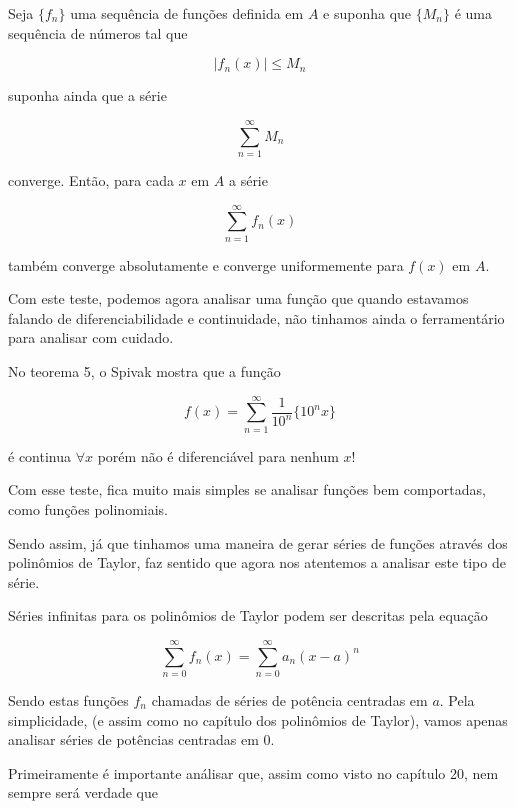 \documentclass[a4paper, 12pt]{article}
\begin{document}
Seja $\{f_n\}$ uma sequência de funções definida em $A$ e suponha que $\{M_n\}$ é uma sequência de números
tal que 

\begin{equation}
	\nonumber |f_n(x) | \leq M_n
\end{equation}

suponha ainda que a série

\begin{equation}
	\nonumber \sum_{n=1}^\infty M_n
\end{equation}

converge. Então, para cada $x$ em $A$ a série

\begin{equation}
	\nonumber \sum_{n=1}^\infty f_n(x)
\end{equation}

também converge absolutamente e converge uniformemente para $f(x)$ em $A$.

Com este teste, podemos agora analisar uma função que quando estavamos falando de diferenciabilidade 
e continuidade, não tinhamos ainda o ferramentário para analisar com cuidado.

No teorema 5, o Spivak mostra que a função

\begin{equation}
	\nonumber f(x) = \sum_{n=1}^\infty \frac{1}{10^n}\{10^nx\}
\end{equation}

é continua $\forall x$ porém não é diferenciável para nenhum $x$!

Com esse teste, fica muito mais simples se analisar funções bem comportadas, como funções polinomiais.

Sendo assim, já que tinhamos uma maneira de gerar séries de funções através dos polinômios de 
Taylor, faz sentido que agora nos atentemos a analisar este tipo de série.

Séries infinitas para os polinômios de Taylor podem ser descritas pela equação

\begin{equation}
	\nonumber \sum_{n=0}^\infty f_n(x) = \sum_{n=0}^\infty a_n(x-a)^n
\end{equation}

Sendo estas funções $f_n$ chamadas de séries de potência centradas em $a$. Pela simplicidade,
(e assim como no capítulo dos polinômios de Taylor), vamos apenas analisar séries de potências
centradas em $0$.

Primeiramente é importante análisar que, assim como visto no capítulo 20, nem sempre será verdade que
\end{document}
